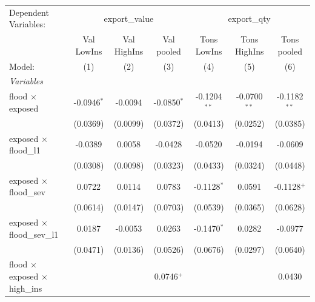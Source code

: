 
\begingroup
\centering
\begin{tabular}{lcccccc}
   \tabularnewline \midrule \midrule
   Dependent Variables: & \multicolumn{3}{c}{export\_value} & \multicolumn{3}{c}{export\_qty}\\
                                                           & Val LowIns      & Val HighIns     & Val pooled            & Tons LowIns           & Tons HighIns    & Tons pooled \\   
   Model:                                                  & (1)             & (2)             & (3)                   & (4)                   & (5)             & (6)\\  
   \midrule
   \emph{Variables}\\
   flood $\times$ exposed                                  & -0.0946$^{*}$   & -0.0094         & -0.0850$^{*}$         & -0.1204$^{**}$        & -0.0700$^{**}$  & -0.1182$^{**}$\\   
                                                           & (0.0369)        & (0.0099)        & (0.0372)              & (0.0413)              & (0.0252)        & (0.0385)\\   
   exposed $\times$ flood\_l1                              & -0.0389         & 0.0058          & -0.0428               & -0.0520               & -0.0194         & -0.0609\\   
                                                           & (0.0308)        & (0.0098)        & (0.0323)              & (0.0433)              & (0.0324)        & (0.0448)\\   
   exposed $\times$ flood\_sev                             & 0.0722          & 0.0114          & 0.0783                & -0.1128$^{*}$         & 0.0591          & -0.1128$^{+}$\\   
                                                           & (0.0614)        & (0.0147)        & (0.0703)              & (0.0539)              & (0.0365)        & (0.0628)\\   
   exposed $\times$ flood\_sev\_l1                         & 0.0187          & -0.0053         & 0.0263                & -0.1470$^{*}$         & 0.0282          & -0.0977\\   
                                                           & (0.0471)        & (0.0136)        & (0.0526)              & (0.0676)              & (0.0297)        & (0.0640)\\   
   flood $\times$ exposed $\times$ high\_ins               &                 &                 & 0.0746$^{+}$          &                       &                 & 0.0430\\   

\end{tabular}
